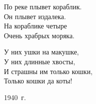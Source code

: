 \noindent\hspace*{\parindent}По реке плывет кораблик.\\
\hspace*{\parindent}Он плывет издалека.\\
\hspace*{\parindent}На кораблике четыре\\
\hspace*{\parindent}Очень храбрых моряка.

\vspace{1em}

\noindent\hspace*{0.35\textwidth}У них ушки на макушке,\\
\hspace*{0.35\textwidth}У них длинные хвосты,\\
\hspace*{0.35\textwidth}И страшны им только кошки,\\
\hspace*{0.35\textwidth}Только кошки да коты!

\vspace{2em}

\begin{flushright}
1940~г.
\end{flushright}
